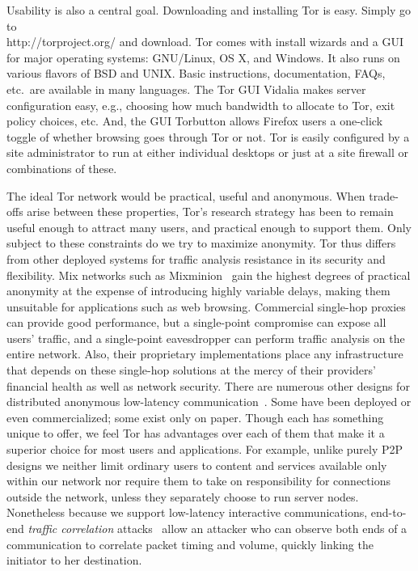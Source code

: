 \documentclass{llncs}
\begin{document}
Usability is also a central goal. Downloading and installing Tor is
easy. Simply go to\\
http://torproject.org/ and download.  Tor comes with install
wizards and a GUI for major operating systems: GNU/Linux, OS X, and
Windows. It also runs on various flavors of BSD and UNIX\@. Basic
instructions, documentation, FAQs, etc.\ are available in many
languages. The Tor GUI Vidalia makes server configuration easy, e.g.,
choosing how much bandwidth to allocate to Tor, exit policy choices,
etc. And, the GUI Torbutton allows Firefox users a one-click toggle of
whether browsing goes through Tor or not.  Tor is easily configured by
a site administrator to run at either individual desktops or just at a
site firewall or combinations of these.

The ideal Tor network would be practical, useful and anonymous. When
trade-offs arise between these properties, Tor's research strategy has
been to remain useful enough to attract many users, and practical
enough to support them.  Only subject to these constraints do we try
to maximize anonymity.  Tor thus differs from other deployed systems
for traffic analysis resistance in its security and flexibility.  Mix
networks such as
Mixminion~\cite{minion-design} gain the highest degrees of practical
anonymity at the expense of introducing highly variable delays, making
them unsuitable for applications such as web browsing.  Commercial
single-hop proxies~\cite{anonymizer} can provide good performance, but
a single-point compromise can expose all users' traffic, and a
single-point eavesdropper can perform traffic analysis on the entire
network.  Also, their proprietary implementations place any
infrastructure that depends on these single-hop solutions at the mercy
of their providers' financial health as well as network security.
There are numerous other designs for distributed anonymous low-latency
communication~\cite{crowds-tissec,web-mix,freedom21-security,i2p,tarzan:ccs02,morphmix:fc04}.
Some have been deployed or even commercialized; some exist only on
paper. Though each has something unique to offer, we feel Tor has
advantages over each of them that make it a superior choice for most
users and applications. For example, unlike purely P2P designs we
neither limit ordinary users to content and services available only
within our network nor require them to take on responsibility for
connections outside the network, unless they separately choose to run
server nodes. Nonetheless because we support low-latency interactive
communications, end-to-end \emph{traffic correlation}
attacks~\cite{danezis:pet2004,defensive-dropping,SS03,hs-attack,bauer:tr2007}
allow an attacker who can observe both ends of a communication to
correlate packet timing and volume, quickly linking the initiator to
her destination.
\end{document}
